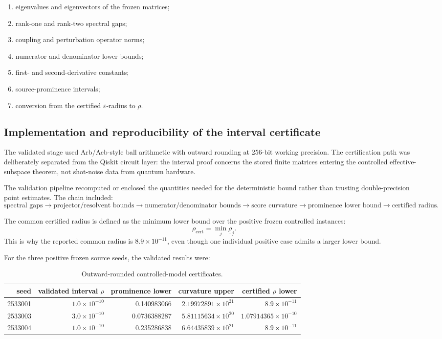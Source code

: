 \documentclass[11pt,a4paper]{article}
\newcommand{\eps}{\varepsilon}
\begin{document}
\begin{enumerate}[label=\arabic*.]
\item eigenvalues and eigenvectors of the frozen matrices;
\item rank-one and rank-two spectral gaps;
\item coupling and perturbation operator norms;
\item numerator and denominator lower bounds;
\item first- and second-derivative constants;
\item source-prominence intervals;
\item conversion from the certified \(\eps\)-radius to \(\rho\).
\end{enumerate}


\subsection{Implementation and reproducibility of the interval certificate}

The validated stage used Arb/Acb-style ball arithmetic with outward rounding
at 256-bit working precision.  The certification path was deliberately
separated from the Qiskit circuit layer: the interval proof concerns the
stored finite matrices entering the controlled effective-subspace theorem,
not shot-noise data from quantum hardware.

The validation pipeline recomputed or enclosed the quantities needed for the
deterministic bound rather than trusting double-precision point estimates.
The chain included:
\[
\text{spectral gaps}
\to
\text{projector/resolvent bounds}
\to
\text{numerator/denominator bounds}
\to
\text{score curvature}
\to
\text{prominence lower bound}
\to
\text{certified radius}.
\]

The common certified radius is defined as the minimum lower bound over the
positive frozen controlled instances:
\[
\rho_{\mathrm{cert}}
=
\min_j \underline{\rho}_j.
\]
This is why the reported common radius is
\(8.9\times10^{-11}\), even though one individual positive case admits a
larger lower bound.

For the three positive frozen source seeds, the validated results were:

\begin{table}[H]
\centering
\caption{Outward-rounded controlled-model certificates.}
\begin{tabular}{@{}rrrrr@{}}
\toprule
seed & validated interval \(\rho\) & prominence lower &
curvature upper & certified \(\rho\) lower\\
\midrule
2533001 & \(1.0\times10^{-10}\) & 0.140983066 &
\(2.19972891\times10^{21}\) & \(8.9\times10^{-11}\)\\
2533003 & \(3.0\times10^{-10}\) & 0.0736388287 &
\(5.81115634\times10^{20}\) & \(1.07914365\times10^{-10}\)\\
2533004 & \(1.0\times10^{-10}\) & 0.235286838 &
\(6.64435839\times10^{21}\) & \(8.9\times10^{-11}\)\\
\bottomrule
\end{tabular}
\end{table}
\end{document}
